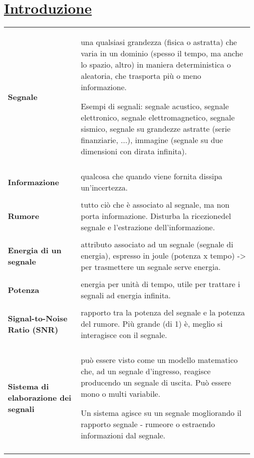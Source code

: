 \documentclass[a4paper, 10pt]{report}
\begin{document}
\section*{\underline{Introduzione}}
\begin{tabular}{lp{}}
\textbf{Segnale} & una qualsiasi grandezza (fisica o astratta) che varia in un dominio (spesso il tempo, ma anche lo spazio, altro) in maniera deterministica o aleatoria, che trasporta più o meno informazione.

Esempi di segnali: segnale acustico, segnale elettronico, segnale elettromagnetico, segnale sismico, segnale su grandezze astratte (serie finanziarie, ...), immagine (segnale su due dimensioni con dirata infinita). \\\\

\textbf{Informazione} & qualcosa che quando viene fornita dissipa un’incertezza.\\\\

\textbf{Rumore} & tutto ciò che è associato al segnale, ma non porta informazione. Disturba la ricezionedel segnale e l’estrazione dell’informazione.\\\\

\textbf{Energia di un segnale} & attributo associato ad un segnale (segnale di energia), espresso in joule (potenza x tempo) -> per trasmettere un segnale serve energia.\\\\

\textbf{Potenza} & energia per unità di tempo, utile per trattare i segnali ad energia infinita.\\\\

\textbf{Signal-to-Noise Ratio (SNR)} & rapporto tra la potenza del segnale e la potenza del rumore. Più grande (di 1) è, meglio si interagisce con il segnale.\\\\

\textbf{Sistema di elaborazione dei segnali} & può essere visto come un modello matematico che, ad un segnale d’ingresso, reagisce producendo un segnale di uscita. Può essere mono o multi variabile.

Un sistema agisce su un segnale mogliorando il rapporto segnale - rumeore o estraendo informazioni dal segnale.\\\\


\end{tabular}
\end{document}
